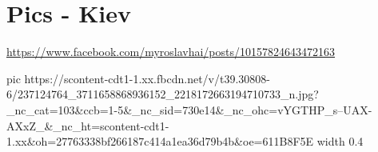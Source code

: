  
 
 
 
 
\section{Pics - Kiev}

\url{https://www.facebook.com/myroslavhai/posts/10157824643472163}

\ifcmt
  pic https://scontent-cdt1-1.xx.fbcdn.net/v/t39.30808-6/237124764_3711658868936152_2218172663194710733_n.jpg?_nc_cat=103&ccb=1-5&_nc_sid=730e14&_nc_ohc=vYGTHP_s--UAX-AXxZ_&_nc_ht=scontent-cdt1-1.xx&oh=27763338bf266187c414a1ea36d79b4b&oe=611B8F5E
  width 0.4
\fi
